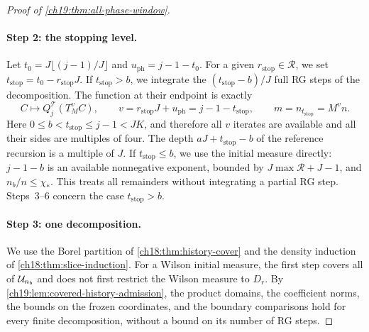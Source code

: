 \begin{proof}[Proof of \cref{ch19:thm:all-phase-window}]
\paragraph{Step 2: the stopping level.}
Let $t_0=J\lfloor(j-1)/J\rfloor$ and $u_{\mathrm{ph}}=j-1-t_0$. For a given $r_{\mathrm{stop}}\in\mathscr R$, we set $t_{\mathrm{stop}}=t_0-r_{\mathrm{stop}}J$. If $t_{\mathrm{stop}}>b$, we integrate the $(t_{\mathrm{stop}}-b)/J$ full RG steps of the decomposition. The function at their endpoint is exactly
\begin{equation}\label{ch19:eq:aligned-source-pullback}
 C\longmapsto Q_j^{\mathcal T}(T_M^vC),\qquad
 v=r_{\mathrm{stop}}J+u_{\mathrm{ph}}=j-1-t_{\mathrm{stop}},\qquad
 m=n_{t_{\mathrm{stop}}}=M^vn.
\end{equation}
Here $0\le b<t_{\mathrm{stop}}\le j-1<JK$, and therefore all $v$ iterates are available and all their sides are multiples of four. The depth $aJ+t_{\mathrm{stop}}-b$ of the reference recursion is a multiple of $J$. If $t_{\mathrm{stop}}\le b$, we use the initial measure directly: $j-1-b$ is an available nonnegative exponent, bounded by $J\max\mathscr R+J-1$, and $n_b/n\le\chi_*$. This treats all remainders without integrating a partial RG step. Steps~3--6 concern the case $t_{\mathrm{stop}}>b$.

\paragraph{Step 3: one decomposition.}
We use the Borel partition of \cref{ch18:thm:history-cover} and the density induction of \cref{ch18:thm:slice-induction}. For a Wilson initial measure, the first step covers all of $\mathcal U_{n_b}$ and does not first restrict the Wilson measure to $D_r$. By \cref{ch19:lem:covered-history-admission}, the product domains, the coefficient norms, the bounds on the frozen coordinates, and the boundary comparisons hold for every finite decomposition, without a bound on its number of RG steps.


\end{proof}

